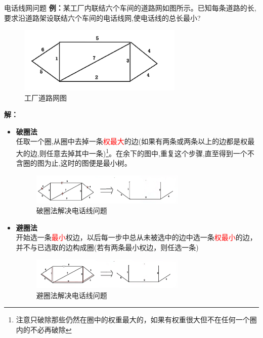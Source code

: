 	\begin{exbox}{电话线网问题}{}
		\textbf{例：}某工厂内联结六个车间的道路网如图所示。已知每条道路的长,要求沿道路架设联结六个车间的电话线网,使电话线的总长最小?
		\begin{figure}[H]
			\centering
			\includegraphics[width=0.7\textwidth]{./image/35.png}
			\caption{工厂道路网图}
			\label{fig:Chapter4_Temporary_Pavilion_1}
		\end{figure}
		\textbf{解：}
		\begin{itemize}
			\item \textbf{破圈法}\\
			任取一个圈,从圈中去掉一条\textcolor{red}{权最大}的边(如果有两条或两条以上的边都是权最大的边,则任意去掉其中一条)\footnote{注意只破除那些仍然在圈中的权重最大的，如果有权重很大但不在任何一个圈内的不必再破除}。在余下的图中,重复这个步骤,直至得到一个不含圈的图为止,这时的图便是最小树。
			\begin{figure}[H]
				\centering
				\includegraphics[width=0.7\textwidth]{./image/36.png}
				\caption{破圈法解决电话线问题}
				\label{fig:Chapter4_Temporary_Pavilion_1}
			\end{figure}
			\item \textbf{避圈法}\\
			开始选一条\textcolor{red}{最小}权边，以后每一步中总从未被选中的边中选一条\textcolor{red}{权最小}的边，并不与已选取的边构成圈(若有两条最小权边，则任选一条)
			\begin{figure}[H]
				\centering
				\includegraphics[width=0.7\textwidth]{./image/37.png}
				\caption{避圈法解决电话线问题}
				\label{fig:Chapter4_Temporary_Pavilion_1}
			\end{figure}
		\end{itemize}
	\end{exbox}
